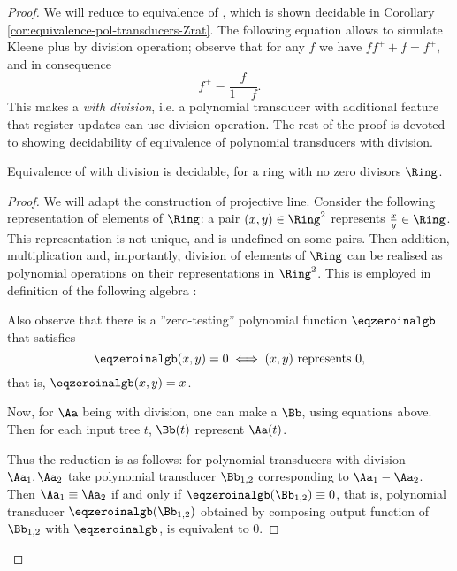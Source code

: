 \begin{proof}
	We will reduce to equivalence of \polTsover{\Zrat}, which is shown decidable in Corollary \ref{cor:equivalence-pol-transducers-Zrat}.
	The following equation allows to simulate Kleene plus by division operation; observe that for any $f$ we have $ff^+ + f = f^+$, and in consequence
	$$
	f^+ = \frac{f}{1-f}.
	$$
	This makes \regTover{\aalg} a \polTover{\Zrat} \emph{with division}, i.e. a polynomial transducer with additional feature that register updates can use division operation.
	The rest of the proof is devoted to showing decidability of equivalence of polynomial transducers with division.
	\begin{lemma}
		Equivalence of \polTsover{\Ring} with division is decidable, for a ring with no zero divisors $\Ring$.
	\end{lemma}
	\begin{proof}
		We will adapt the construction of projective line.
		Consider the following representation of elements of $\Ring$: a pair $(x,y)\in \Ring^2$ represents $\frac{x}{y} \in \Ring$. This representation is not unique, and is undefined on some pairs. Then addition, multiplication and, importantly, division of elements of $\Ring$ can be realised as polynomial operations on their representations in $\Ring^2$. This is employed in definition of the following algebra \balg:
		
		Also observe that there is a ''zero-testing'' polynomial function $\eqzeroinalgb$ that satisfies
		$$
		\eqzeroinalgb(x,y) = 0 \iff (x,y) \text { represents } 0,
		$$
		that is, $\eqzeroinalgb(x,y) = x$.
		
		Now, for $\Aa$ being \polTover{\Ring} with division, one can make a \polTover{\balg} $\Bb$, using equations above. Then for each input tree $t$, $\Bb(t)$ represent $\Aa(t)$.
		
		Thus the reduction is as follows: for polynomial transducers with division $\Aa_1, \Aa_2$ take polynomial transducer $\Bb_{1,2}$ corresponding to $\Aa_1-\Aa_2$. Then $\Aa_1 \equiv \Aa_2$
		if and only if 
		$\eqzeroinalgb(\Bb_{1,2}) \equiv 0$,
		that is,
		polynomial transducer $\eqzeroinalgb(\Bb_{1,2})$ obtained by composing output function of $\Bb_{1,2}$ with $\eqzeroinalgb$, is equivalent to $0$.
	\end{proof}	
\end{proof}

